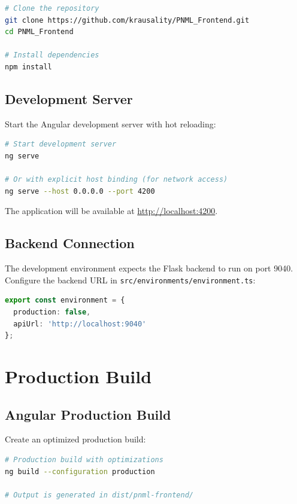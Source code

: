 \begin{lstlisting}[language=bash, caption={Cloning and installing dependencies}]
# Clone the repository
git clone https://github.com/krausality/PNML_Frontend.git
cd PNML_Frontend

# Install dependencies
npm install
\end{lstlisting}

\subsection{Development Server}

Start the Angular development server with hot reloading:

\begin{lstlisting}[language=bash, caption={Starting the development server}]
# Start development server
ng serve

# Or with explicit host binding (for network access)
ng serve --host 0.0.0.0 --port 4200
\end{lstlisting}

The application will be available at \url{http://localhost:4200}.

\subsection{Backend Connection}

The development environment expects the Flask backend to run on port 9040. Configure the backend URL in \texttt{src/environments/environment.ts}:

\begin{lstlisting}[language=TypeScript, caption={Development environment configuration}]
export const environment = {
  production: false,
  apiUrl: 'http://localhost:9040'
};
\end{lstlisting}

\section{Production Build}
\label{sec:production-build}

\subsection{Angular Production Build}

Create an optimized production build:

\begin{lstlisting}[language=bash, caption={Creating a production build}]
# Production build with optimizations
ng build --configuration production

# Output is generated in dist/pnml-frontend/
\end{lstlisting}

